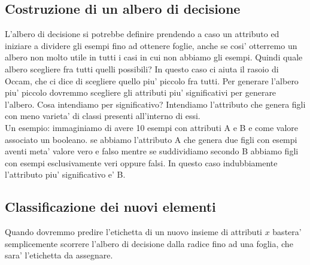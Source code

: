 \subsection*{Costruzione di un albero di decisione}
L'albero di decisione si potrebbe definire prendendo a caso un attributo ed iniziare a dividere gli esempi fino ad ottenere foglie, anche se cosi' otterremo un albero  non molto utile in tutti i casi in cui non abbiamo gli esempi. Quindi quale albero scegliere fra tutti quelli possibili? In questo caso ci aiuta il rasoio di Occam, che ci dice di scegliere quello piu' piccolo fra tutti. Per generare l'albero piu' piccolo dovremmo scegliere gli attributi piu' significativi per generare l'albero. Cosa intendiamo per significativo? Intendiamo l'attributo che genera figli con meno varieta' di classi presenti all'interno di essi.\\ Un esempio: immaginiamo di avere 10 esempi con attributi A e B e come valore associato un booleano. se abbiamo l'attributo A che genera due figli con esempi aventi meta' valore vero e falso mentre se suddividiamo secondo B abbiamo figli con esempi esclusivamente veri oppure falsi. In questo caso indubbiamente l'attributo piu' significativo e' B.

\subsection*{Classificazione dei nuovi elementi}
Quando dovremmo predire l'etichetta di un nuovo insieme di attributi $x$ bastera' semplicemente scorrere l'albero di decisione dalla radice fino ad una foglia, che sara' l'etichetta da assegnare.

